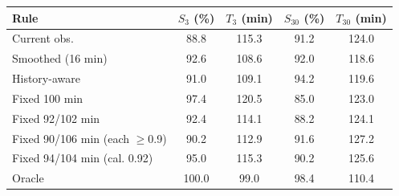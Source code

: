 \begin{tabular}{lcccc}
\toprule
Rule & $S_3$ (\%) & $T_3$ (min) & $S_{30}$ (\%) & $T_{30}$ (min) \\
\midrule
Current obs. & 88.8 & 115.3 & 91.2 & 124.0 \\
Smoothed (16 min) & 92.6 & 108.6 & 92.0 & 118.6 \\
History-aware & 91.0 & 109.1 & 94.2 & 119.6 \\
Fixed 100 min & 97.4 & 120.5 & 85.0 & 123.0 \\
Fixed 92/102 min & 92.4 & 114.1 & 88.2 & 124.1 \\
Fixed 90/106 min (each $\geq$0.9) & 90.2 & 112.9 & 91.6 & 127.2 \\
Fixed 94/104 min (cal. 0.92) & 95.0 & 115.3 & 90.2 & 125.6 \\
Oracle & 100.0 & 99.0 & 98.4 & 110.4 \\
\bottomrule
\end{tabular}
